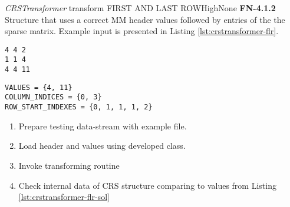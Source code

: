 \begin{testcase}{\emph{CRSTransformer} transform FIRST AND LAST ROW}{High}{None}
	{
		\textbf{FN-4.1.2}
	}
	{
		Structure that uses a correct \gls{MM} header values followed by entries of the the sparse matrix. Example input is presented in Listing \ref{lst:crstransformer-flr}. 	
	}
	\begin{lstlisting}[label={lst:crstransformer-flr},
	basicstyle=\small,caption={\gls{MM} format data example}, frame=single]
%%MatrixMarket matrix coordinate real general
4 4 2
1 1 4
4 4 11
	\end{lstlisting}
	\begin{lstlisting}[label={lst:crstransformer-flr-sol},
	basicstyle=\small,caption={\gls{CRS} format internal data example}, frame=single]
VALUES = {4, 11}
COLUMN_INDICES = {0, 3}
ROW_START_INDEXES = {0, 1, 1, 1, 2}
	\end{lstlisting}
	{
		\begin{enumerate}
			\item Prepare testing data-stream with example file.
			\item Load header and values using developed class.
			\item Invoke transforming routine 
			\item
			{
				Check internal data of \gls{CRS} structure comparing to values from Listing \ref{lst:crstransformer-flr-sol} 
			}
		\end{enumerate}
	}
\end{testcase}